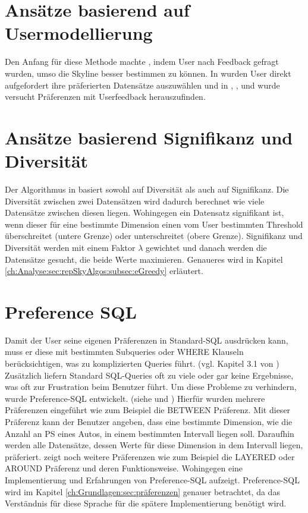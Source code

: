 \section{Ansätze basierend auf Usermodellierung}
\label{ch:Forschungsstand:sec:userModel}
Den Anfang für diese Methode machte \cite{948}, indem User nach Feedback gefragt wurden, umso die Skyline besser bestimmen zu können.
In \cite{Lofi10efficientcomputation} wurden User direkt aufgefordert ihre präferierten Datensätze auszuwählen und in \cite{lee2008optimal}, \cite{Mindolin:2009:DRI:1687627.1687697}, \cite{Mindolin:2011:PEP:1969331.1969354} und \cite{Zhao10callto} wurde versucht Präferenzen mit Userfeedback herauszufinden.
\section{Ansätze basierend Signifikanz und Diversität}
\label{ch:Forschungsstand:sec:userModel}
Der Algorithmus in \cite{magnani2014taking} basiert sowohl auf Diversität als auch auf Signifikanz. Die Diversität zwischen zwei Datensätzen wird dadurch berechnet wie viele Datensätze zwischen diesen liegen. Wohingegen ein Datensatz signifikant ist, wenn dieser für eine bestimmte Dimension einen vom User bestimmten Threshold überschreitet (untere Grenze) oder unterschreitet (obere Grenze).
Signifikanz und Diversität werden mit einem Faktor $\lambda$ gewichtet und danach werden die Datensätze gesucht, die beide Werte maximieren. Genaueres wird in Kapitel \ref{ch:Analyse:sec:repSkyAlgos:subsec:eGreedy} erläutert.
\section{Preference SQL}
\label{ch:Forschungsstand:sec:prefSQL}
Damit der User seine eigenen Präferenzen in Standard-SQL ausdrücken kann, muss er diese mit bestimmten Subqueries oder WHERE Klauseln berücksichtigen, was zu komplizierten Queries führt. (vgl. Kapitel 3.1 von \cite{borzsony2001skyline}) Zusätzlich liefern Standard SQL-Queries oft zu viele oder gar keine Ergebnisse, was oft zur Frustration beim Benutzer führt. Um diese Probleme zu verhindern, wurde Preference-SQL entwickelt. (siehe \cite{kiessling2002foundations} und \cite{kiessling2011preference}) Hierfür wurden mehrere Präferenzen eingeführt wie zum Beispiel die BETWEEN Präferenz. Mit dieser Präferenz kann der Benutzer angeben, dass eine bestimmte Dimension, wie die Anzahl an PS eines Autos, in einem bestimmten Intervall liegen soll. Daraufhin werden alle Datensätze, dessen Werte für diese Dimension in dem Intervall liegen, präferiert. \cite{kiessling2002foundations} zeigt noch weitere Präferenzen wie zum Beispiel die LAYERED oder AROUND Präferenz und deren Funktionsweise. Wohingegen \cite{kiessling2002preference} eine Implementierung und Erfahrungen von Preference-SQL aufzeigt. 
Preference-SQL wird im Kapitel \ref{ch:Grundlagen:sec:präferenzen} genauer betrachtet, da das Verständnis für diese Sprache für die spätere Implementierung benötigt wird.
